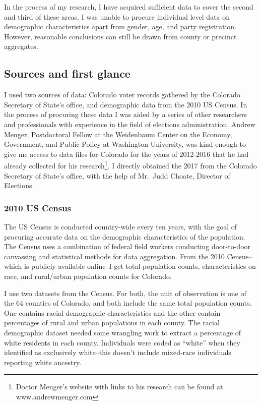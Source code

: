 \documentclass[12pt,twoside]{reedthesis}
\begin{document}
  In the process of my research, I have acquired sufficient data to cover
  the second and third of these areas. I was unable to procure individual
  level data on demographic characteristics apart from gender, age, and
  party registration. However, reasonable conclusions can still be drawn
  from county or precinct aggregates.
  
  \subsection{Sources and first glance}\label{sources-and-first-glance}
  
  I used two sources of data: Colorado voter records gathered by the
  Colorado Secretary of State's office, and demographic data from the 2010
  US Census. In the process of procuring these data I was aided by a
  series of other researchers and professionals with experience in the
  field of elections administration. Andrew Menger, Postdoctoral Fellow at
  the Weidenbaum Center on the Economy, Government, and Public Policy at
  Washington University, was kind enough to give me access to data files
  for Colorado for the years of 2012-2016 that he had already collected
  for his research\footnote{Doctor Menger's website with links to his
    research can be found at www.andrewmenger.com}. I directly obtained
  the 2017 from the Colorado Secretary of State's office, with the help of
  Mr.~Judd Choate, Director of Elections.
  
  \subsubsection{2010 US Census}\label{us-census}
  
  The US Census is conducted country-wide every ten years, with the goal
  of procuring accurate data on the demographic characteristics of the
  population. The Census uses a combination of federal field workers
  conducting door-to-door canvassing and statistical methods for data
  aggregation. From the 2010 Census--which is publicly available online--I
  get total population counts, characteristics on race, and rural/urban
  population counts for Colorado.
  
  I use two datasets from the Census. For both, the unit of observation is
  one of the 64 counties of Colorado, and both include the same total
  population counts. One contains racial demographic characteristics and
  the other contain percentages of rural and urban populations in each
  county. The racial demographic dataset needed some wrangling work to
  extract a percentage of white residents in each county. Individuals were
  coded as ``white'' when they identified as exclusively white--this
  doesn't include mixed-race individuals reporting white ancestry.
  
\end{document}
